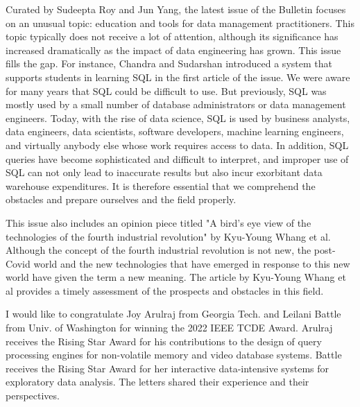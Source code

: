 \documentclass[11pt]{article}
\begin{document}
Curated by Sudeepta Roy and Jun Yang, the latest issue of the Bulletin
focuses on an unusual topic: education and tools for data management
practitioners. This topic typically does not receive a lot of
attention, although its significance has increased dramatically as the
impact of data engineering has grown. This issue fills the gap. For
instance, Chandra and Sudarshan introduced a system that supports
students in learning SQL in the first article of the issue.  We were
aware for many years that SQL could be difficult to use. But
previously, SQL was mostly used by a small number of database
administrators or data management engineers. Today, with the rise of
data science, SQL is used by business analysts, data engineers, data
scientists, software developers, machine learning engineers, and
virtually anybody else whose work requires access to data. In
addition, SQL queries have become sophisticated and difficult to
interpret, and improper use of SQL can not only lead to inaccurate
results but also incur exorbitant data warehouse expenditures. It is
therefore essential that we comprehend the obstacles and prepare
ourselves and the field properly.

This issue also includes an opinion piece titled "A bird's eye view of
the technologies of the fourth industrial revolution" by Kyu-Young
Whang et al. Although the concept of the fourth industrial revolution
is not new, the post-Covid world and the new technologies that have
emerged in response to this new world have given the term a new
meaning. The article by Kyu-Young Whang et al provides a timely
assessment of the prospects and obstacles in this field.

I would like to congratulate Joy Arulraj from Georgia Tech. and
Leilani Battle from Univ. of Washington for winning the 2022 IEEE TCDE
Award. Arulraj receives the Rising Star Award for his contributions to
the design of query processing engines for non-volatile memory and
video database systems.  Battle receives the Rising Star Award for her
interactive data-intensive systems for exploratory data analysis. The
letters shared their experience and their perspectives.
\end{document}
